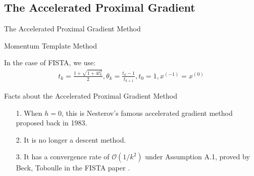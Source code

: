 \documentclass[11pt]{beamer}
\begin{document}
    \subsection{The Accelerated Proximal Gradient}
        \begin{frame}{The Accelerated Proximal Gradient Method}
            \begin{block}{Momentum Template Method}
                {\scriptsize
                \begin{algorithm}[H]
                    \begin{algorithmic}[1]
                        \ENDFOR
                    \end{algorithmic}
                    \caption{Template Proximal Gradient Method With Momentum}\label{alg:fista_template}
                \end{algorithm}
                }
            \end{block}
            In the case of FISTA, we use: 
            \begin{align*}
                t_k = \frac{1 + \sqrt{1 + 4t_k^2}}{2}, \theta_k = \frac{t_k - 1}{t_{k + 1}}, t_0 = 1, x^{(-1)} = x^{(0)}
            \end{align*}
        \end{frame}
        \begin{frame}{Facts about the Accelerated Proximal Gradient Method}
            \begin{itemize}
                \item [1.] When $h = 0$, this is Nesterov's famous accelerated gradient method proposed back in 1983. 
                \item [2.] It is no longer a descent method. 
                \item [3.] It has a convergence rate of $\mathcal O(1/k^2)$ under Assumption A.1, proved by Beck, Toboulle in the FISTA paper \cite{paper:FISTA}. 
            \end{itemize}
        \end{frame}
    
\end{document}
